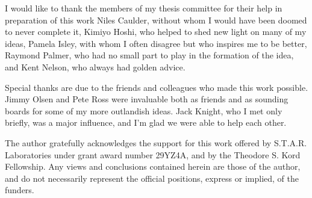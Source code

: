
\begin{acknowledgments}

I would like to thank the members of my thesis committee for their help in preparation of this work Niles Caulder, without whom I would have been doomed to never complete it, Kimiyo Hoshi, who helped to shed new light on many of my ideas, Pamela Isley, with whom I often disagree but who inspires me to be better, Raymond Palmer, who had no small part to play in the formation of the idea, and Kent Nelson, who always had golden advice.

Special thanks are due to the friends and colleagues who made this work possible. Jimmy Olsen and Pete Ross were invaluable both as friends and as sounding boards for some of my more outlandish ideas. Jack Knight, who I met only briefly, was a major influence, and I'm glad we were able to help each other. 

The author gratefully acknowledges the support for this work offered by S.T.A.R. Laboratories under grant award number 29YZ4A, and by the Theodore S. Kord Fellowship. Any views and conclusions contained herein are those of the author, and do not necessarily represent the official positions, express or implied, of the funders.

\end{acknowledgments}
